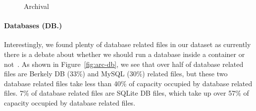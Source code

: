 
\begin{figure}
	\centering
	\caption{Archival}
	\label{fig:arc-doc}
\end{figure} 

\paragraph{Databases (DB.)}

Interestingly, we found plenty of database related files in our dataset as currently there is a debate about whether we should run a database inside a container or not~\cite{xxx}. As shown in Figure~\ref{fig:arc-db}, we see that over half of database related files are Berkely DB (33\%) and MySQL (30\%) related files, but these two database related files take less than 40\% of capacity occupied by database related files. 7\% of database related files are SQLite DB files, which take up over 57\% of capacity occupied by database related files. 

